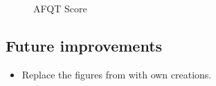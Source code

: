 \begin{figure}[htp]\centering
\caption{AFQT Score}
\end{figure}

\FloatBarrier\subsection{Future improvements}

\begin{itemize}
\item Replace the figures from \citet{Spence.1973} with own creations.
\end{itemize}
